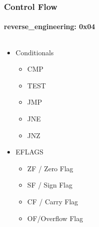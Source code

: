 \documentclass[aspectratio=169]{beamer}
\begin{document}
\begin{frame}
  \frametitle{Control Flow}
  \framesubtitle{reverse\_engineering: 0x04}
  \begin{columns}
    \begin{column}{.5\textwidth}
      \begin{itemize}
        \item{Conditionals}
          \begin{itemize}
          \item{CMP}
          \item{TEST}
          \item{JMP}
          \item{JNE}
          \item{JNZ}
          \end{itemize}
      \item{EFLAGS}
        \begin{itemize}
        \item{ZF / Zero Flag}
        \item{SF / Sign Flag}
        \item{CF / Carry Flag}
        \item{OF/Overflow Flag}
        \end{itemize}
      \end{itemize}
    \end{column}
    \hfill
    \begin{column}{.5\textwidth}
      \begin{center}

\end{center}
\end{column}
\end{columns}
\end{frame}
\end{document}
